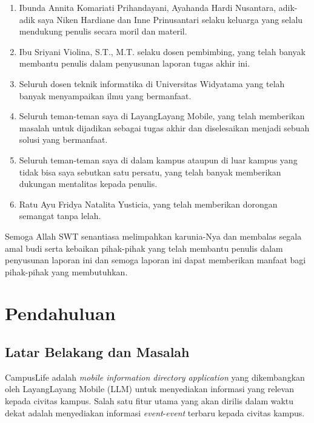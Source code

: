 \documentclass[a4paper, 12pt, oneside]{report}
\begin{document}
\begin{enumerate}
  \item Ibunda Annita Komariati Prihandayani, Ayahanda Hardi Nusantara, adik-adik saya Niken Hardiane dan Inne Prinusantari selaku keluarga yang selalu mendukung penulis secara moril dan materil.
  \item Ibu Sriyani Violina, S.T., M.T. selaku dosen pembimbing, yang telah banyak membantu penulis dalam penyusunan laporan tugas akhir ini.
  \item Seluruh dosen teknik informatika di Universitas Widyatama yang telah banyak menyampaikan ilmu yang bermanfaat.
  \item Seluruh teman-teman saya di LayangLayang Mobile, yang telah memberikan masalah untuk dijadikan sebagai tugas akhir dan diselesaikan menjadi sebuah solusi yang bermanfaat.
  \item Seluruh teman-teman saya di dalam kampus ataupun di luar kampus yang
tidak bisa saya sebutkan satu persatu, yang telah banyak memberikan dukungan mentalitas kepada penulis.
  \item Ratu Ayu Fridya Natalita Yusticia, yang telah memberikan dorongan semangat tanpa lelah.
\end{enumerate}

\onehalfspacing Semoga Allah SWT senantiasa melimpahkan karunia-Nya dan membalas segala amal budi serta kebaikan pihak-pihak yang telah membantu penulis dalam penyusunan laporan ini dan semoga laporan ini dapat memberikan manfaat bagi pihak-pihak yang membutuhkan.

\onehalfspacing
{}
\tableofcontents
\setcounter{secnumdepth}{5}
\setcounter{tocdepth}{7}

\listoffigures

\chapter{Pendahuluan}
\section{Latar Belakang dan Masalah}
\onehalfspacing CampusLife adalah \textit{mobile information directory application} yang dikembangkan oleh LayangLayang Mobile (LLM) untuk menyediakan informasi yang relevan kepada civitas kampus. Salah satu fitur utama yang akan dirilis dalam waktu dekat adalah menyediakan informasi \textit{event}-\textit{event} terbaru kepada civitas kampus.
\end{document}
